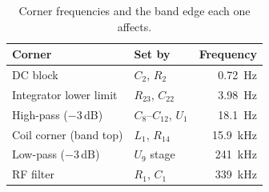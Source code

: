 \documentclass[11pt,a4paper]{article}
\begin{document}
\begin{table}[htbp]
  \centering
  \caption{Corner frequencies and the band edge each one affects.}
  \label{tab:arch-corners}
  \small
  \begin{tabular}{@{}llr@{}}
    \toprule
    Corner & Set by & Frequency \\
    \midrule
    DC block               & $C_2$, $R_2$           & \SI{0.72}{\hertz} \\
    Integrator lower limit & $R_{23}$, $C_{22}$     & \SI{3.98}{\hertz} \\
    High-pass ($-3$\,dB)   & $C_8$--$C_{12}$, $U_1$ & \SI{18.1}{\hertz} \\
    \midrule
    Coil corner (band top) & $L_1$, $R_{14}$        & \SI{15.9}{\kilo\hertz} \\
    Low-pass ($-3$\,dB)    & $U_9$ stage            & \SI{241}{\kilo\hertz} \\
    RF filter              & $R_1$, $C_1$           & \SI{339}{\kilo\hertz} \\
    \bottomrule
  \end{tabular}
\end{table}
\end{document}
